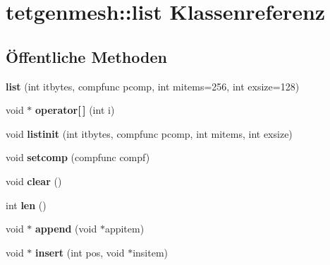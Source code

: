 \hypertarget{classtetgenmesh_1_1list}{\section{tetgenmesh\-:\-:list Klassenreferenz}
\label{classtetgenmesh_1_1list}
}
\subsection*{Öffentliche Methoden}
\begin{DoxyCompactItemize}
\item 
\hypertarget{classtetgenmesh_1_1list_ad8bfd6a2a442d022d8be152a2e53a74a}{{\bfseries list} (int itbytes, compfunc pcomp, int mitems=256, int exsize=128)}\label{classtetgenmesh_1_1list_ad8bfd6a2a442d022d8be152a2e53a74a}

\item 
\hypertarget{classtetgenmesh_1_1list_a6b8195ec4058d16b0efafc49947e06be}{void $\ast$ {\bfseries operator\mbox{[}$\,$\mbox{]}} (int i)}\label{classtetgenmesh_1_1list_a6b8195ec4058d16b0efafc49947e06be}

\item 
\hypertarget{classtetgenmesh_1_1list_afe98be084dac1ca9e316e2610385107e}{void {\bfseries listinit} (int itbytes, compfunc pcomp, int mitems, int exsize)}\label{classtetgenmesh_1_1list_afe98be084dac1ca9e316e2610385107e}

\item 
\hypertarget{classtetgenmesh_1_1list_a62547bd11a755e04bad136560ce77c66}{void {\bfseries setcomp} (compfunc compf)}\label{classtetgenmesh_1_1list_a62547bd11a755e04bad136560ce77c66}

\item 
\hypertarget{classtetgenmesh_1_1list_a14086c46f4348d2060a1d5c03534868f}{void {\bfseries clear} ()}\label{classtetgenmesh_1_1list_a14086c46f4348d2060a1d5c03534868f}

\item 
\hypertarget{classtetgenmesh_1_1list_a9a981166f630f2f3ed949fd8f98e5adb}{int {\bfseries len} ()}\label{classtetgenmesh_1_1list_a9a981166f630f2f3ed949fd8f98e5adb}

\item 
\hypertarget{classtetgenmesh_1_1list_a510a58296fe472bb965bbd81b02ea472}{void $\ast$ {\bfseries append} (void $\ast$appitem)}\label{classtetgenmesh_1_1list_a510a58296fe472bb965bbd81b02ea472}

\item 
\hypertarget{classtetgenmesh_1_1list_ac5b32b80e0f56642ec2196a1d2c7d9cc}{void $\ast$ {\bfseries insert} (int pos, void $\ast$insitem)}\label{classtetgenmesh_1_1list_ac5b32b80e0f56642ec2196a1d2c7d9cc}


\end{DoxyCompactItemize}
